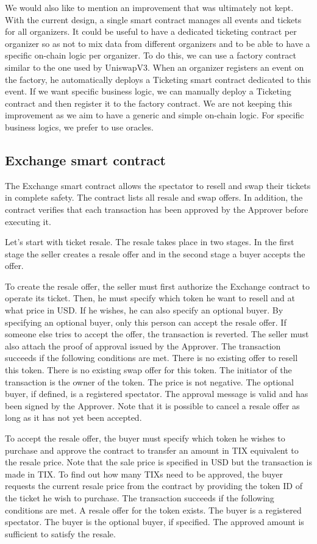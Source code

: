 \documentclass[a4paper,11pt,oneside]{report}
\begin{document}
We would also like to mention an improvement that was ultimately not kept. With the current design, a single smart contract manages all events and tickets for all organizers. It could be useful to have a dedicated ticketing contract per organizer so as not to mix data from different organizers and to be able to have a specific on-chain logic per organizer. To do this, we can use a factory contract similar to the one used by UniswapV3. When an organizer registers an event on the factory, he automatically deploys a Ticketing smart contract dedicated to this event. If we want specific business logic, we can manually deploy a Ticketing contract and then register it to the factory contract. We are not keeping this improvement as we aim to have a generic and simple on-chain logic. For specific business logics, we prefer to use oracles.

\subsection{Exchange smart contract}
The Exchange smart contract allows the spectator to resell and swap their tickets in complete safety. The contract lists all resale and swap offers. In addition, the contract verifies that each transaction has been approved by the Approver before executing it.

Let's start with ticket resale. The resale takes place in two stages. In the first stage the seller creates a resale offer and in the second stage a buyer accepts the offer.

To create the resale offer, the seller must first authorize the Exchange contract to operate its ticket. Then, he must specify which token he want to resell and at what price in USD. If he wishes, he can also specify an optional buyer. By specifying an optional buyer, only this person can accept the resale offer. If someone else tries to accept the offer, the transaction is reverted. The seller must also attach the proof of approval issued by the Approver. The transaction succeeds if the following conditions are met. There is no existing offer to resell this token. There is no existing swap offer for this token. The initiator of the transaction is the owner of the token. The price is not negative. The optional buyer, if defined, is a registered spectator. The approval message is valid and has been signed by the Approver. Note that it is possible to cancel a resale offer as long as it has not yet been accepted.

To accept the resale offer, the buyer must specify which token he wishes to purchase and approve the contract to transfer an amount in TIX equivalent to the resale price. Note that the sale price is specified in USD but the transaction is made in TIX. To find out how many TIXs need to be approved, the buyer requests the current resale price from the contract by providing the token ID of the ticket he wish to purchase. The transaction succeeds if the following conditions are met. A resale offer for the token exists. The buyer is a registered spectator. The buyer is the optional buyer, if specified. The approved amount is sufficient to satisfy the resale.
\end{document}
